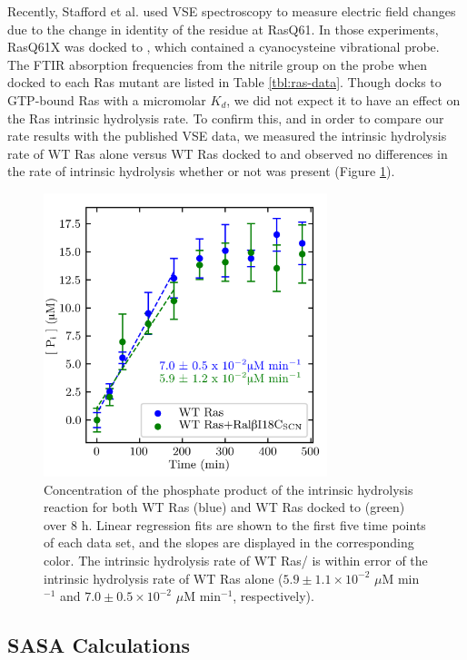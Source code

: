 Recently, Stafford et al. used VSE spectroscopy to measure electric field changes due to the change in identity of the residue at RasQ61\cite{Stafford2012}. 
In those experiments, RasQ61X was docked to \RalBSCN{}, which contained a cyanocysteine vibrational probe. 
The FTIR absorption frequencies from the nitrile group on the probe when docked to each Ras mutant are listed in Table \ref{tbl:ras-data}. 
Though \RalB{} docks to GTP-bound Ras with a micromolar $K_d$, we did not expect it to have an effect on the Ras intrinsic hydrolysis rate. 
To confirm this, and in order to compare our rate results with the published VSE data, we measured the intrinsic hydrolysis rate of WT Ras alone versus WT Ras docked to \RalBSCN{} and observed no differences in the rate of intrinsic hydrolysis whether or not \RalBSCN{} was present (Figure \ref{fig:ras-ral}).

\begin{figure}
    \center
    \includegraphics[width=3.25in]{figures-ras/Figure3.png}
    \caption{Concentration of the phosphate product of the intrinsic hydrolysis reaction for both WT Ras (blue) and WT Ras docked to \RalBSCN{} (green) over 8 h. Linear regression fits are shown to the first five time points of each data set, and the slopes are displayed in the corresponding color. The intrinsic hydrolysis rate of WT Ras/\RalBSCN{} is within error of the intrinsic hydrolysis rate of WT Ras alone ($5.9 \pm 1.1 \times 10^{-2}$ $\mu$M min$^{-1}$ and $7.0 \pm 0.5 \times 10^{-2}$ $\mu$M min$^{-1}$, respectively).}
    \label{fig:ras-ral}
\end{figure}

\subsection{SASA Calculations}

